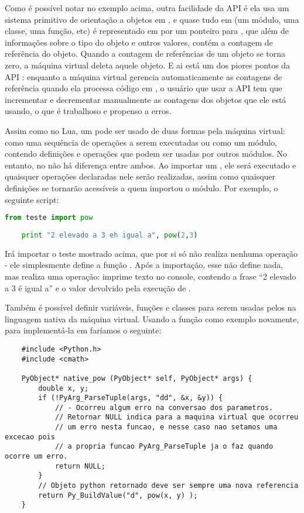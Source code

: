     \vspace{1em}
    
    Como é possível notar no exemplo acima, outra facilidade da API é ela usa um sistema 
    primitivo de orientação a objetos em \C{}, e quase tudo em  (um módulo, uma 
    classe, uma função, etc) é representado em \C{} por um ponteiro para , 
    que além de informações sobre o tipo do objeto e outros valores, contém a contagem de 
    referência do objeto. Quando a contagem de referências de um objeto se torna zero, a 
    máquina virtual deleta aquele objeto. E ai está um dos piores pontos da API : 
    enquanto a máquina virtual gerencia automaticamente as contagens de referência
    quando ela processa código em , o usuário que usar a API \C{} tem que incrementar e 
    decrementar manualmente as contagens dos objetos que ele está usando, o que é trabalhoso e 
    propenso a erros.
    
    Assim como no Lua, um \script{} pode ser usado de duas formas pela máquina virtual:
    como uma sequência de operações a serem executadas ou como um módulo, contendo definições
    e operações que podem ser usadas por outros módulos. No entanto, no  não há diferença
    entre ambos. Ao importar um \script{} , ele será executado e quaisquer operações
    declaradas nele serão realizadas, assim como quaisquer definições se tornarão acessíveis
    a quem importou o módulo. Por exemplo, o seguinte script:
    \begin{lstlisting}[language=python]
    from teste import pow
    
    print "2 elevado a 3 eh igual a", pow(2,3)
    \end{lstlisting}
    Irá importar o \script{} teste mostrado acima, que por si só não realiza nenhuma operação -
    ele simplesmente define a função . Após a importação, esse \script{} não
    define nada, mas realiza uma operação: imprime texto no console, contendo a frase
    ``2 elevado a 3 é igual a'' e o valor devolvido pela execução de .
    
    Também é possível definir variáveis, funções e classes para serem usadas pelos 
    na linguagem nativa da máquina virtual. Usando a função  como exemplo novamente,
    para implementá-la em \C{} faríamos o seguinte:
    
    \begin{lstlisting}
    #include <Python.h>
    #include <cmath>
    
    PyObject* native_pow (PyObject* self, PyObject* args) {
        double x, y;
        if (!PyArg_ParseTuple(args, "dd", &x, &y)) {
            // - Ocorreu algum erro na conversao dos parametros.
            // Retornar NULL indica para a maquina virtual que ocorreu
            // um erro nesta funcao, e nesse caso nao setamos uma excecao pois
            // a propria funcao PyArg_ParseTuple ja o faz quando ocorre um erro.
            return NULL;
        }
        // Objeto python retornado deve ser sempre uma nova referencia
        return Py_BuildValue("d", pow(x, y) );
    }
    \end{lstlisting}
    
